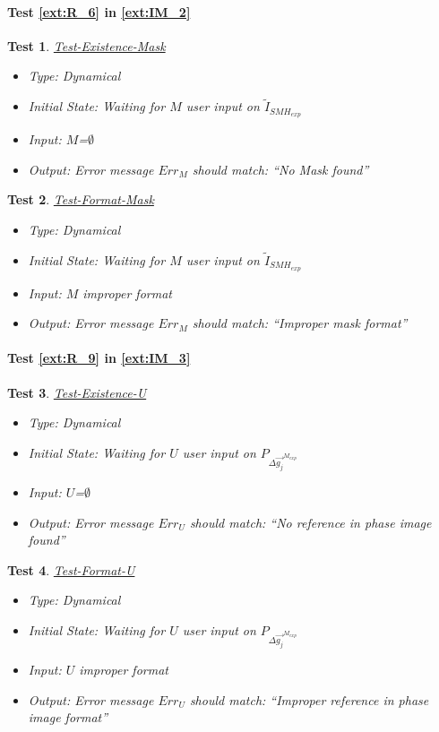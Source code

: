 \documentclass[12pt, titlepage]{article}
\newtheorem{Test}{Test}
\begin{document}
\paragraph{Test \cref{ext:R_6} in \cref{ext:IM_2}}

\begin{Test}\normalfont\underline{Test-Existence-Mask}
\begin{itemize}
\item Type: Dynamical
\item Initial State: Waiting for $M$ user input on $\widetilde{I}_{SMH_{exp}}$
\item Input: $M$=$\emptyset$
\item Output:  Error message $Err_{M}$ should match: \enquote{No Mask found}
\end{itemize}
\end{Test}

\begin{Test}\normalfont\underline{Test-Format-Mask}
\begin{itemize}
\item Type: Dynamical
\item Initial State: Waiting for $M$ user input on $\widetilde{I}_{SMH_{exp}}$
\item Input: $M$ improper format
\item Output:  Error message $Err_{M}$ should match: \enquote{Improper mask format}
\end{itemize}
\end{Test}

\paragraph{Test \cref{ext:R_9} in \cref{ext:IM_3}}

\begin{Test}\normalfont\underline{Test-Existence-U}
\begin{itemize}
\item Type: Dynamical
\item Initial State: Waiting for $U$ user input on $P_{\Delta \overrightarrow{g_{j}}^{M_{exp}}}$
\item Input: $U$=$\emptyset$
\item Output:  Error message $Err_{U}$ should match: \enquote{No reference in phase image found}
\end{itemize}
\end{Test}

\begin{Test}\normalfont\underline{Test-Format-U}
\begin{itemize}
\item Type: Dynamical
\item Initial State: Waiting for $U$ user input on $P_{\Delta \overrightarrow{g_{j}}^{M_{exp}}}$
\item Input: $U$ improper format
\item Output:  Error message $Err_{U}$ should match: \enquote{Improper reference in phase image format}
\end{itemize}
\end{Test}
\end{document}
